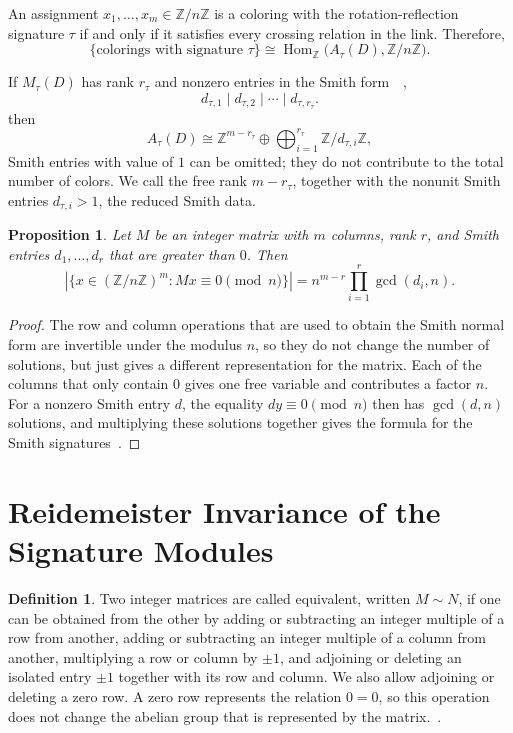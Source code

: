 \documentclass[11pt]{article}
\newtheorem{proposition}[theorem]{Proposition}
\theoremstyle{definition}
\newtheorem{definition}[theorem]{Definition}
\newcommand{\Z}{\mathbb{Z}}
\newcommand{\HomZ}{\operatorname{Hom}_{\Z}}
\begin{document}
An assignment $x_1,\ldots,x_m\in\Z/n\Z$ is a coloring with the rotation-reflection signature $\tau$ if and only if it satisfies every crossing relation in the link. Therefore,
\[
\{\text{colorings with signature }\tau\}
\cong
\HomZ\bigl(A_\tau(D),\Z/n\Z\bigr).
\]

If $M_\tau(D)$ has rank $r_\tau$ and nonzero entries in the Smith form~\cite[Section~12.1]{dummitfoote}~\cite[Sections~2.1--2.2]{stanley},
\[
d_{\tau,1}\mid d_{\tau,2}\mid\cdots\mid d_{\tau,r_\tau}.
\]
then
\[
A_\tau(D)
\cong
\Z^{m-r_\tau}\oplus
\bigoplus_{i=1}^{r_\tau}\Z/d_{\tau,i}\Z,
\]
Smith entries with value of $1$ can be omitted; they do not contribute to the total number of colors. We call the free rank $m-r_\tau$, together with the nonunit Smith entries $d_{\tau,i}>1$, the reduced Smith data.

\begin{proposition}
Let $M$ be an integer matrix with $m$ columns, rank $r$, and Smith entries $d_1,\ldots,d_r$ that are greater than $0$. Then
\[
\left|\{x\in(\Z/n\Z)^m:Mx\equiv0\pmod n\}\right|
=
n^{m-r}\prod_{i=1}^{r}\gcd(d_i,n).
\]
\end{proposition}

\begin{proof}
The row and column operations that are used to obtain the Smith normal form are invertible under the modulus $n$, so they do not change the number of solutions, but just gives a different representation for the matrix. Each of the columns that only contain $0$ gives one free variable and contributes a factor $n$. For a nonzero Smith entry $d$, the equality $dy\equiv0\pmod n$ then has $\gcd(d,n)$ solutions, and multiplying these solutions together gives the formula for the Smith signatures~\cite[Corollary~2.2]{ge}.
\end{proof}

\section{Reidemeister Invariance of the Signature Modules}

\begin{definition}
Two integer matrices are called equivalent, written $M\sim N$, if one can be obtained from the other by adding or subtracting an integer multiple of a row from another, adding or subtracting an integer multiple of a column from another, multiplying a row or column by $\pm1$, and adjoining or deleting an isolated entry $\pm1$ together with its row and column. We also allow adjoining or deleting a zero row. A zero row represents the relation $0=0$, so this
operation does not change the abelian group that is represented by the matrix.~\cite[Section~2.1]{ge}.
\end{definition}
\end{document}
